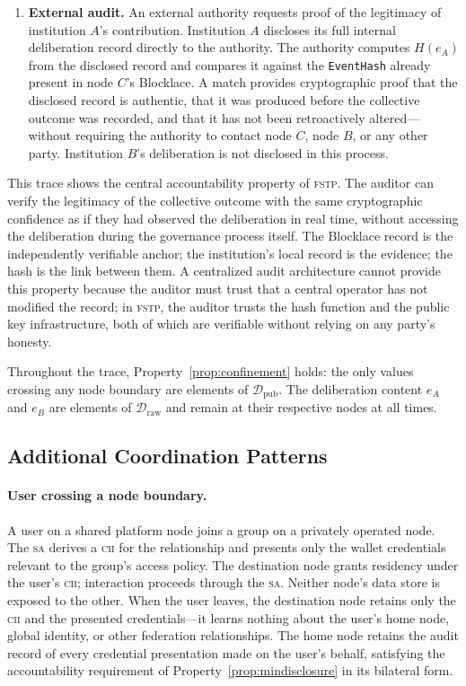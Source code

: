 \documentclass[12pt]{article}
\newcommand{\Draw}{\mathcal{D}_{\text{raw}}}
\newcommand{\Dpub}{\mathcal{D}_{\text{pub}}}
\newcommand{\SA}{\textsc{sa}}
\newcommand{\FSTP}{\textsc{fstp}}
\newcommand{\CII}{\textsc{cii}}
\begin{document}
\begin{enumerate}[itemsep=3pt,topsep=4pt]
		\item \textbf{External audit.} An external authority requests proof
		of the legitimacy of institution $A$'s contribution. Institution
		$A$ discloses its full internal deliberation record directly to
		the authority. The authority computes $H(e_A)$ from the disclosed
		record and compares it against the \texttt{EventHash} already
		present in node $C$'s Blocklace. A match provides cryptographic
		proof that the disclosed record is authentic, that it was produced
		before the collective outcome was recorded, and that it has not
		been retroactively altered---without requiring the authority to
		contact node $C$, node $B$, or any other party. Institution $B$'s
		deliberation is not disclosed in this process.
		
	\end{enumerate}
	
	This trace shows the central accountability property of \FSTP{}. The
	auditor can verify the legitimacy of the collective outcome with the
	same cryptographic confidence as if they had observed the deliberation
	in real time, without accessing the deliberation during the governance
	process itself. The Blocklace record is the independently verifiable
	anchor; the institution's local record is the evidence; the hash is
	the link between them. A centralized audit architecture cannot provide
	this property because the auditor must trust that a central operator
	has not modified the record; in \FSTP{}, the auditor trusts the hash
	function and the public key infrastructure, both of which are
	verifiable without relying on any party's honesty.
	
	Throughout the trace, Property~\ref{prop:confinement} holds: the only
	values crossing any node boundary are elements of $\Dpub$. The
	deliberation content $e_A$ and $e_B$ are elements of $\Draw$ and
	remain at their respective nodes at all times.
	
	\subsection{Additional Coordination Patterns}
	\label{sec:scenario:others}
	
	\paragraph{User crossing a node boundary.}
	
	A user on a shared platform node joins a group on a privately operated
	node. The \SA{} derives a \CII{} for the relationship and presents
	only the wallet credentials relevant to the group's access policy. The
	destination node grants residency under the user's \CII{}; interaction
	proceeds through the \SA{}. Neither node's data store is exposed to
	the other. When the user leaves, the destination node retains only the
	\CII{} and the presented credentials---it learns nothing about the
	user's home node, global identity, or other federation relationships.
	The home node retains the audit record of every credential
	presentation made on the user's behalf, satisfying the accountability
	requirement of Property~\ref{prop:mindisclosure} in its bilateral
	form.
	
\end{document}
